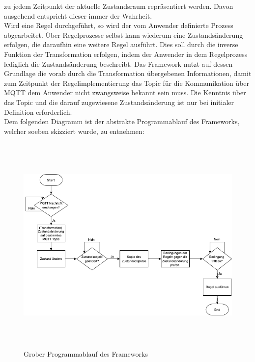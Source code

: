         zu jedem Zeitpunkt der aktuelle Zustandsraum repräsentiert werden. Davon ausgehend entspricht dieser immer der Wahrheit.
        \\
        \linebreak
        Wird eine Regel durchgeführt, so wird der vom Anwender definierte Prozess abgearbeitet. Über Regelprozesse selbst kann wiederum eine 
        Zustandsänderung erfolgen, die daraufhin eine weitere Regel ausführt. Dies soll durch die inverse Funktion der Transformation erfolgen, indem der 
        Anwender in dem Regelprozess lediglich die Zustandsänderung beschreibt. Das Framework nutzt auf dessen Grundlage die vorab durch die Transformation 
        übergebenen Informationen, damit zum Zeitpunkt der Regelimplementierung das Topic für die Kommunikation über \acs{MQTT} dem Anwender nicht zwangsweise 
        bekannt sein muss. Die Kenntnis über das Topic und die darauf zugewiesene Zustandsänderung ist nur bei initialer Definition erforderlich. 
        \pagebreak
        \\
        \linebreak
        Dem folgenden Diagramm ist der abstrakte Programmablauf des Frameworks, welcher soeben skizziert wurde, zu entnehmen:
        \begin{figure}[hbt!]
            \centering
            \includegraphics[width=14cm,height=11cm,keepaspectratio]{images/Programmablauf_Framework.png}
            \caption{Grober Programmablauf des Frameworks}
            \label{fig:programmablauf_framework}
        \end{figure}
